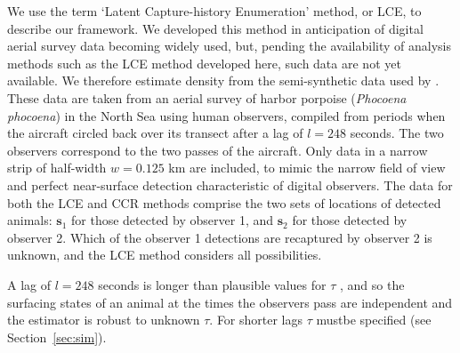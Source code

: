 \documentclass[useAMS, usenatbib, referee]{biom}\usepackage[]{graphicx}\usepackage[]{color}
\begin{document}
We use the term `Latent Capture-history Enumeration' method, or LCE, to describe our framework. We  developed this method in anticipation of digital aerial survey data becoming widely used, but, pending the availability of analysis methods such as the LCE method developed here, such data are not yet available. We therefore estimate density from the semi-synthetic data used by \cite{Stevenson+al:19}. These data are taken from an aerial survey of harbor porpoise ({\em Phocoena phocoena}) in the North Sea using human observers, compiled from periods when the aircraft circled back over its transect after a lag of $l=248$ seconds.
The two observers correspond to the two passes of the aircraft. Only data in a narrow strip of half-width $w=0.125$ km are included, to mimic the narrow field of view and perfect near-surface detection characteristic of digital observers. The data for both the LCE and CCR methods comprise the two sets of locations of detected animals: $\bm{s}_1$ for those detected by observer 1, and $\bm{s}_2$ for those detected by observer 2. Which of the observer 1 detections are recaptured by observer 2 is unknown, and the LCE method considers all possibilities.

A lag of $l=248$ seconds is longer than plausible values for $\tau$ \citep{Stevenson+al:19}, and so the surfacing states of an animal at the times the observers pass are independent and the estimator is robust to unknown $\tau$. For shorter lags $\tau$ mustbe specified (see Section~\ref{sec:sim}).

\end{document}
